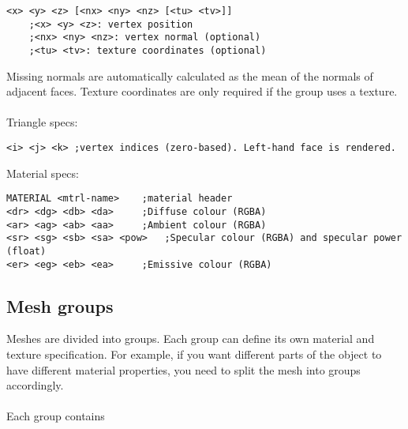 \documentclass[Orbiter Developer Manual.tex]{subfiles}
\begin{document}
\begin{lstlisting}[language=OSFS]
<x> <y> <z> [<nx> <ny> <nz> [<tu> <tv>]]
	;<x> <y> <z>: vertex position
	;<nx> <ny> <nz>: vertex normal (optional)
	;<tu> <tv>: texture coordinates (optional)
\end{lstlisting}

\noindent
Missing normals are automatically calculated as the mean of the normals of adjacent faces. Texture coordinates are only required if the group uses a texture.\\
\\
Triangle specs:

\begin{lstlisting}[language=OSFS]
<i> <j> <k>	;vertex indices (zero-based). Left-hand face is rendered.
\end{lstlisting}

\noindent
Material specs:

\begin{lstlisting}[language=OSFS]
MATERIAL <mtrl-name>	;material header
<dr> <dg> <db> <da>		;Diffuse colour (RGBA)
<ar> <ag> <ab> <aa>		;Ambient colour (RGBA)
<sr> <sg> <sb> <sa> <pow>	;Specular colour (RGBA) and specular power (float)
<er> <eg> <eb> <ea>		;Emissive colour (RGBA)
\end{lstlisting}


\subsection{Mesh groups}
Meshes are divided into groups. Each group can define its own material and texture specification. For example, if you want different parts of the object to have different material properties, you need to split the mesh into groups accordingly.\\
\\
Each group contains
\end{document}
